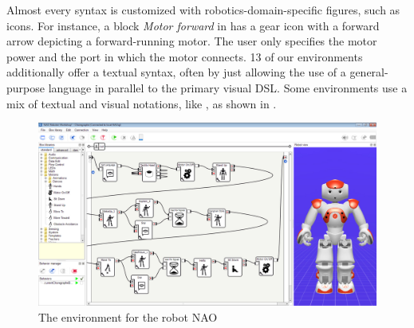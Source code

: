 Almost every syntax
is customized with robotics-domain-specific figures, such as icons. For instance, a block \emph{Motor forward} in \trik has a gear icon with a forward arrow depicting a forward-running motor. The user only specifies the motor power and the port in which the motor connects. 13 of our environments additionally offer a textual syntax, often by just allowing the use of a general-purpose language in parallel to the primary visual DSL. Some environments use a mix of textual and visual notations, like \easyc, as shown in .

\begin{figure}[t]
\vspace{-.4cm}
     \centering
    \includegraphics[width=\columnwidth]{fig/examples/choregraphe.jpg}
      \caption{The environment \choregraphe for the robot NAO}
      \label{fig:choregraphe}
			
   \end{figure}





